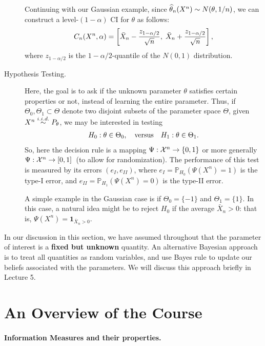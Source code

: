 \documentclass[12pt]{article}
\begin{document}
\begin{description}
    Continuing with our Gaussian example, since $\widehat{\theta}_n(X^n) \sim N(\theta, 1/n)$, we can construct a level-$(1-\alpha)$ CI for $\theta$ as follows: 
    \begin{align}
    C_n(X^n, \alpha) = \left[ \bar{X}_n - \frac{z_{1-\alpha/2}}{\sqrt{n}}, \;  \bar{X}_n + \frac{z_{1-\alpha/2}}{\sqrt{n}} \right],  
    \end{align}
    where  $z_{1-\alpha/2}$ is the $1-\alpha/2$-quantile of the $N(0,1)$ distribution. 
    \item[Hypothesis Testing.] Here, the goal is to ask if the unknown parameter $\theta$ satisfies certain properties or not, instead of learning the entire parameter. Thus, if $\Theta_0, \Theta_1 \subset \Theta$ denote two disjoint subsets of the parameter space $\Theta$, given $X^n \stackrel{i.i.d.}{\sim} P_\theta$, we may be interested in testing 
    \begin{align}
    H_0: \theta \in \Theta_0, \quad \text{versus} \quad H_1: \theta \in \Theta_1. 
    \end{align}
    So, here the decision rule is a mapping $\Psi:{\cal X}^n \to \{0,1\}$ or more generally $\Psi:{\cal X}^n \to [0,1]$~(to allow for randomization). The performance of this test is measured by its errors $(e_I, e_{II})$, where $e_I = \mathbb{P}_{H_0}(\Psi(X^n) = 1)$ is the type-I error, and $e_{II} = \mathbb{P}_{H_1}(\Psi(X^n)=0)$ is the type-II error. 
    
    A simple example in the Gaussian case is if $\Theta_0 = \{-1\}$ and $\Theta_1 = \{1\}$. In this case, a natural idea might be to reject $H_0$ if the average $\bar{X}_n>0$: that is, $\Psi(X^n) = \boldsymbol{1}_{\bar{X}_n>0}$.
\end{description}

\begin{remark}
In our discussion in this section, we have assumed throughout that the parameter of interest is a \textbf{fixed but unknown} quantity. An alternative Bayesian approach is to treat all quantities as random variables, and use Bayes rule to update our beliefs associated with the parameters. We will discuss this approach briefly in Lecture 5. 
\end{remark}


\section{An Overview of the Course}

\paragraph{Information Measures and their properties.} 
\end{document}
